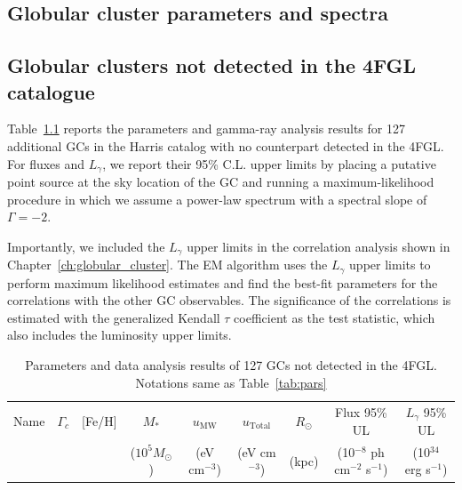 \documentclass[doublespace,nopageskip]{VTthesis} %
\begin{document}
\begin{appendices}



\chapter{Globular cluster parameters and spectra} \label{app:glbcs}
  
\section{Globular clusters not detected in the 4FGL catalogue}\label{appx:nodetect}

Table~\ref{tab:nondetect} reports the parameters and gamma-ray analysis results for 127 additional GCs in the Harris catalog with no counterpart detected in the 4FGL. For fluxes and $L_\gamma$, we report their 95\% C.L. upper limits by placing a putative point source at the sky location of the GC and running a maximum-likelihood procedure in which we assume a power-law spectrum with a spectral slope of $\Gamma = -2$.

Importantly, we included the $L_\gamma$ upper limits in the correlation analysis shown in Chapter~\ref{ch:globular_cluster}. The EM algorithm uses the $L_\gamma$ upper limits to perform maximum likelihood estimates and find the best-fit parameters for the correlations with the other GC observables. The significance of the correlations is estimated with the generalized Kendall $\tau$ coefficient as the test statistic, which also includes the luminosity upper limits. 

\begin{center}
\scriptsize
\begin{longtable}{lcccccccr}
\caption{Parameters and data analysis results of 127 GCs not detected in the 4FGL. Notations same as Table~\ref{tab:pars}}\label{tab:nondetect} \\
\hline \multicolumn{1}{c}{{Name}} & \multicolumn{1}{c}{{$\Gamma_c$}} & \multicolumn{1}{c}{{[Fe/H]}} & \multicolumn{1}{c}{{$M_*$}} & \multicolumn{1}{c}{{$u_\text{MW}$}} & \multicolumn{1}{c}{{$u_\text{Total}$}} & \multicolumn{1}{c}{{$R_\odot$}} & \multicolumn{1}{c}{{Flux 95\% UL}} & \multicolumn{1}{c}{{$L_\gamma$ 95\% UL}}\\ 
\multicolumn{1}{c}{{}} & \multicolumn{1}{c}{{}} & \multicolumn{1}{c}{{}} & \multicolumn{1}{c}{{($10^5 M_\odot$)}} & \multicolumn{1}{c}{{(eV cm$^{-3}$)}} & \multicolumn{1}{c}{{(eV cm$^{-3}$)}} & \multicolumn{1}{c}{{(kpc)}} & \multicolumn{1}{c}{{(10$^{-8}$ ph cm$^{-2}$ s$^{-1}$)}} & \multicolumn{1}{c}{{(10$^{34}$ erg s$^{-1}$)}}\\ \hline
\endfirsthead


\end{longtable}
\end{center}
\end{appendices}
\end{document}
